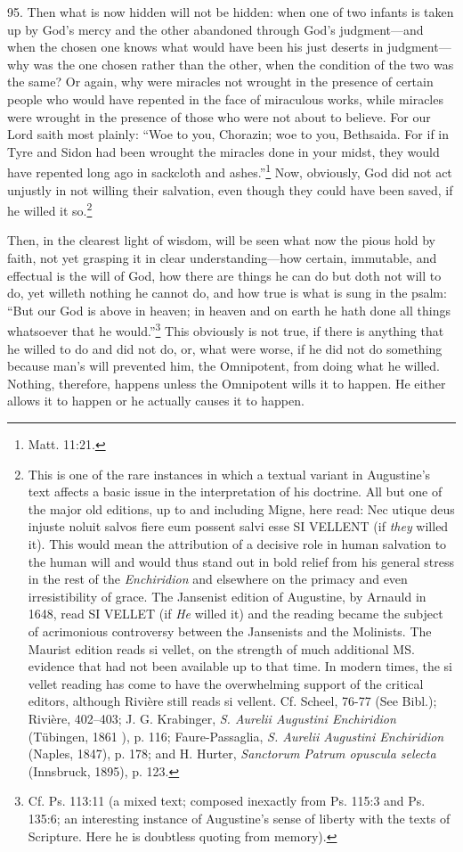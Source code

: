 95. Then what is now hidden will not be hidden: when one of two infants is taken up by God's mercy and the other abandoned through God's judgment—and when the chosen one knows what would have been his just deserts in judgment—why was the one chosen rather than the other, when the condition of the two was the same? Or again, why were miracles not wrought in the presence of certain people who would have repented in the face of miraculous works, while miracles were wrought in the presence of those who were not about to believe. For our Lord saith most plainly: ``Woe to you, Chorazin; woe to you, Bethsaida. For if in Tyre and Sidon had been wrought the miracles done in your midst, they would have repented long ago in sackcloth and ashes.''\footnote{Matt. 11:21.} Now, obviously, God did not act unjustly in not willing their salvation, even though they could have been saved, if he willed it so.\footnote{This is one of the rare instances in which a textual variant in Augustine's text affects a basic issue in the interpretation of his doctrine. All but one of the major old editions, up to and including Migne, here read: Nec utique deus injuste noluit salvos fiere eum possent salvi esse SI VELLENT (if \emph{they} willed it). This would mean the attribution of a decisive role in human salvation to the human will and would thus stand out in bold relief from his general stress in the rest of the \emph{Enchiridion} and elsewhere on the primacy and even irresistibility of grace. The Jansenist edition of Augustine, by Arnauld in 1648, read SI VELLET (if \emph{He} willed it) and the reading became the subject of acrimonious controversy between the Jansenists and the Molinists. The Maurist edition reads si vellet, on the strength of much additional MS. evidence that had not been available up to that time. In modern times, the si vellet reading has come to have the overwhelming support of the critical editors, although Rivière still reads si vellent. Cf. Scheel, 76-77 (See Bibl.); Rivière, 402–403; J. G. Krabinger, \emph{S. Aurelii Augustini Enchiridion} (Tübingen, 1861 ), p. 116; Faure-Passaglia, \emph{S. Aurelii Augustini Enchiridion} (Naples, 1847), p. 178; and H. Hurter, \emph{Sanctorum Patrum opuscula selecta} (Innsbruck, 1895), p. 123.}

Then, in the clearest light of wisdom, will be seen what now the pious hold by faith, not yet grasping it in clear understanding—how certain, immutable, and effectual is the will of God, how there are things he can do but doth not will to do, yet willeth nothing he cannot do, and how true is what is sung in the psalm: ``But our God is above in heaven; in heaven and on earth he hath done all things whatsoever that he would.''\footnote{Cf. Ps. 113:11 (a mixed text; composed inexactly from Ps. 115:3 and Ps. 135:6; an interesting instance of Augustine's sense of liberty with the texts of Scripture. Here he is doubtless quoting from memory).} This obviously is not true, if there is anything that he willed to do and did not do, or, what were worse, if he did not do something because man's will prevented him, the Omnipotent, from doing what he willed. Nothing, therefore, happens unless the Omnipotent wills it to happen. He either allows it to happen or he actually causes it to happen.

